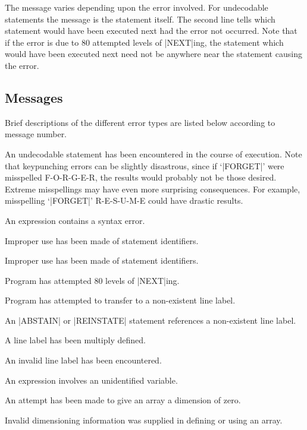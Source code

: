 The message varies depending upon the error involved.  For undecodable
statements the message is the statement itself.  The second line tells
which statement would have been executed next had the error not occurred.
Note that if the error is due to 80 attempted levels of |NEXT|ing, the
statement which would have been executed next need not be anywhere near the
statement causing the error.

\subsection{Messages}

Brief descriptions of the different error types are listed below according
to message number.

\begin{description}
\def\ttitem#1{\item[{\tt #1}]}

\ttitem{000} An undecodable statement has been encountered in the course of
        execution.  Note that keypunching errors can be slightly disastrous,
        since if `|FORGET|' were misspelled F-O-R-G-E-R, the results would 
        probably not be those desired.  Extreme misspellings may have even 
        more surprising consequences.  For example, misspelling `|FORGET|' 
        R-E-S-U-M-E could have drastic results.

\ttitem{017} An expression contains a syntax error.

\ttitem{079} Improper use has been made of statement identifiers.

\ttitem{099} Improper use has been made of statement identifiers.

\ttitem{123} Program has attempted 80 levels of |NEXT|ing.

\ttitem{129} Program has attempted to transfer to a non-existent line label.

\ttitem{139} An |ABSTAIN| or |REINSTATE| statement references a non-existent line label.

\ttitem{182} A line label has been multiply defined.

\ttitem{197} An invalid line label has been encountered.

\ttitem{200} An expression involves an unidentified variable.

\ttitem{240} An attempt has been made to give an array a dimension of zero.

\ttitem{241} Invalid dimensioning information was supplied in defining or using
        an array.


\end{description}
